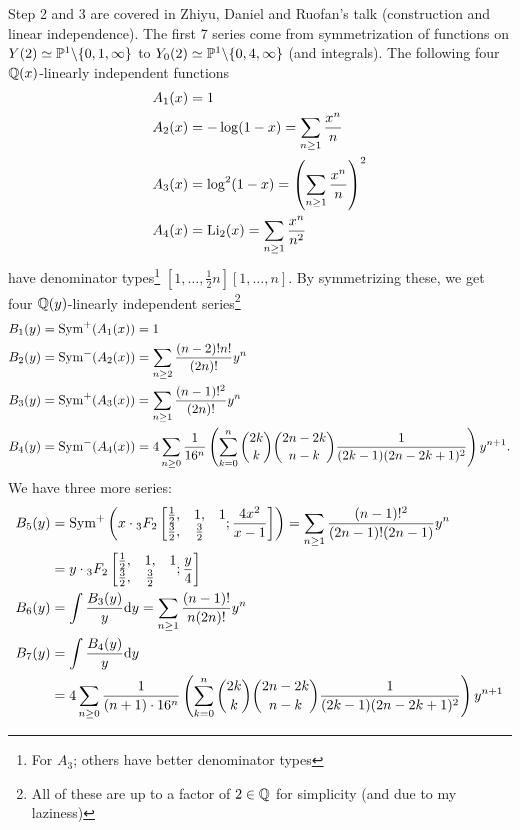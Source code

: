 Step 2 and 3 are covered in Zhiyu, Daniel and Ruofan's talk (construction and linear independence).
The first 7 series come from symmetrization of functions on $Y(2) \simeq \mathbb{P}^1 \backslash \{0, 1, \infty\}$ to $Y_0(2) \simeq \mathbb{P}^1 \backslash \{0, 4 ,\infty\}$ (and integrals).
The following four $\mathbb{Q}(x)$-linearly independent functions
\begin{align*}
    A_1(x) &= 1\\
    A_2(x) &= -\log (1 - x) = \sum_{n \ge 1} \frac{x^n}{n} \\
    A_3(x) &= \log^2(1 - x) = \left(\sum_{n \ge 1} \frac{x^n}{n}\right)^2 \\
    A_4(x) &= \mathrm{Li}_2(x) = \sum_{n \ge 1} \frac{x^n}{n^2}
\end{align*}
have denominator types\footnote{For $A_3$; others have better denominator types} $[1, \dots, \frac{1}{2}n][1, \dots, n]$.
By symmetrizing these, we get four $\mathbb{Q}(y)$-linearly independent series\footnote{All of these are up to a factor of $2 \in \mathbb{Q}$ for simplicity (and due to my laziness)}
\begin{align*}
    B_1(y) &= \mathrm{Sym}^+ (A_1(x)) = 1 \\
    B_2(y) &= \mathrm{Sym}^- (A_2(x)) = \sum_{n \ge 2} \frac{(n-2)!n!}{(2n)!}y^n  \\
    B_3(y) &= \mathrm{Sym}^+ (A_3(x)) = \sum_{n \ge 1}\frac{(n-1)!^2}{(2n)!} y^n \\
    B_4(y) &= \mathrm{Sym}^- (A_4(x)) = 4 \sum_{n \ge 0} \frac{1}{16^n}  \left(\sum_{k=0}^{n} \binom{2k}{k} \binom{2n-2k}{n-k} \frac{1}{(2k-1)(2n-2k+1)^2}\right)y^{n+1}.
\end{align*}
We have three more series:
\begin{align*}
    B_5(y) &= \mathrm{Sym}^+\left(x \cdot {}_{3}F_{2} \left[\begin{matrix}
    \frac{1}{2}, & 1, & 1 \\ \frac{3}{2}, & \frac{3}{2} &
    \end{matrix}; \frac{4x^2}{x - 1}\right]\right) = \sum_{n \ge 1} \frac{(n-1)!^2}{(2n-1)!(2n-1)} y^n \\
    &= y \cdot {}_{3}F_{2} \left[\begin{matrix}
    \frac{1}{2}, & 1, & 1 \\ \frac{3}{2}, & \frac{3}{2} &
    \end{matrix}; \frac{y}{4}\right] \\
    B_6(y) &= \int \frac{B_3(y)}{y} \mathrm{d} y = \sum_{n \ge 1} \frac{(n-1)!}{n(2n)!} y^n \\
    B_7(y) &= \int \frac{B_4(y)}{y} \mathrm{d} y \\
    &= 4 \sum_{n \ge 0} \frac{1}{(n+1) \cdot 16^n}  \left(\sum_{k=0}^{n} \binom{2k}{k} \binom{2n-2k}{n-k} \frac{1}{(2k-1)(2n-2k+1)^2}\right)y^{n+1}
\end{align*}
